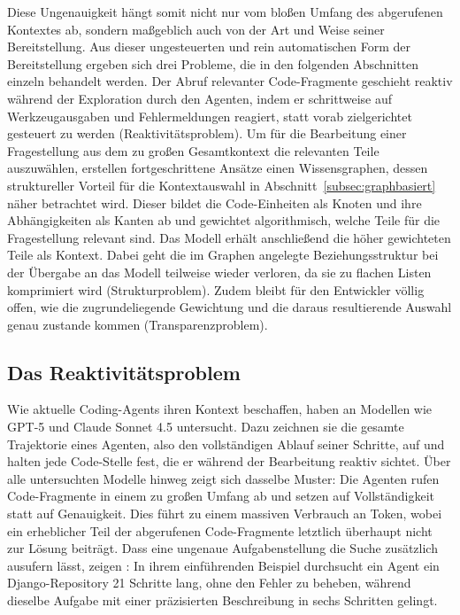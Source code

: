 Diese Ungenauigkeit hängt somit nicht nur vom bloßen Umfang des abgerufenen Kontextes ab, sondern maßgeblich auch von der Art und Weise seiner Bereitstellung. Aus dieser ungesteuerten und rein automatischen Form der Bereitstellung ergeben sich drei Probleme, die in den folgenden Abschnitten einzeln behandelt werden. Der Abruf relevanter Code-Fragmente geschieht reaktiv während der Exploration durch den Agenten, indem er schrittweise auf Werkzeugausgaben und Fehlermeldungen reagiert, statt vorab zielgerichtet gesteuert zu werden (Reaktivitätsproblem). Um für die Bearbeitung einer Fragestellung aus dem zu großen Gesamtkontext die relevanten Teile auszuwählen, erstellen fortgeschrittene Ansätze einen Wissensgraphen, dessen struktureller Vorteil für die Kontextauswahl in Abschnitt~\ref{subsec:graphbasiert} näher betrachtet wird. Dieser bildet die Code-Einheiten als Knoten und ihre Abhängigkeiten als Kanten ab und gewichtet algorithmisch, welche Teile für die Fragestellung relevant sind. Das Modell erhält anschließend die höher gewichteten Teile als Kontext. Dabei geht die im Graphen angelegte Beziehungsstruktur bei der Übergabe an das Modell teilweise wieder verloren, da sie zu flachen Listen komprimiert wird (Strukturproblem). Zudem bleibt für den Entwickler völlig offen, wie die zugrundeliegende Gewichtung und die daraus resultierende Auswahl genau zustande kommen (Transparenzproblem).

\subsection{Das Reaktivitätsproblem}

Wie aktuelle Coding-Agents ihren Kontext beschaffen, haben \textcite{li2026contextbench} an Modellen wie GPT-5 und Claude Sonnet 4.5 untersucht. Dazu zeichnen sie die gesamte Trajektorie eines Agenten, also den vollständigen Ablauf seiner Schritte, auf und halten jede Code-Stelle fest, die er während der Bearbeitung reaktiv sichtet. Über alle untersuchten Modelle hinweg zeigt sich dasselbe Muster: Die Agenten rufen Code-Fragmente in einem zu großen Umfang ab und setzen auf Vollständigkeit statt auf Genauigkeit. Dies führt zu einem massiven Verbrauch an Token, wobei ein erheblicher Teil der abgerufenen Code-Fragmente letztlich überhaupt nicht zur Lösung beiträgt. Dass eine ungenaue Aufgabenstellung die Suche zusätzlich ausufern lässt, zeigen \textcite{suri2026codescout}: In ihrem einführenden Beispiel durchsucht ein Agent ein Django-Repository 21 Schritte lang, ohne den Fehler zu beheben, während dieselbe Aufgabe mit einer präzisierten Beschreibung in sechs Schritten gelingt.

